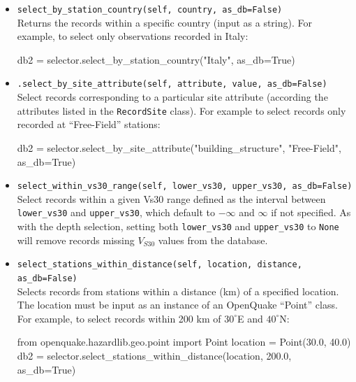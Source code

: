 \begin{itemize}
\item \verb;select_by_station_country(self, country, as_db=False);\\

Returns the records within a specific country (input as a string). For example, to select only observations recorded in Italy:

\begin{python}
db2 = selector.select_by_station_country("Italy",
                                         as_db=True)
\end{python}

\item \verb;.select_by_site_attribute(self, attribute, value, as_db=False);\\

Select records corresponding to a particular site attribute (according the attributes listed in the \verb=RecordSite= class). For example to select records only recorded at ``Free-Field'' stations:

\begin{python}
db2 = selector.select_by_site_attribute("building_structure", 
                                        "Free-Field",
                                        as_db=True)
\end{python}

\item \verb;select_within_vs30_range(self, lower_vs30, upper_vs30, as_db=False);\\

Select records within a given Vs30 range defined as the interval between \verb=lower_vs30= and \verb=upper_vs30=, which default to $-\infty$ and $\infty$ if not specified. As with the depth selection, setting both \verb=lower_vs30= and \verb=upper_vs30= to \verb=None= will remove records missing $V_{S30}$ values from the database. 

\item \verb;select_stations_within_distance(self, location, distance, as_db=False);\\

Selects records from stations within a distance (km) of a specified location. The location must be input as an instance of an OpenQuake ``Point'' class. For example, to select records within 200 km of $30^{\circ}$E and $40^{\circ}$N:

\begin{python}
from openquake.hazardlib.geo.point import Point
location = Point(30.0, 40.0)
db2 = selector.select_stations_within_distance(location,
                                               200.0,
                                               as_db=True)
\end{python}


\end{itemize}
